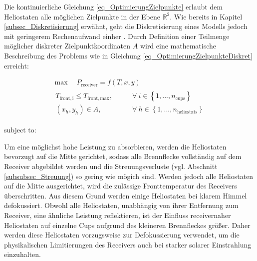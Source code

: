 Die kontinuierliche Gleichung \ref{eq_OptimierungZielpunkte} erlaubt dem Heliostaten alle möglichen Zielpunkte in der Ebene $\mathbb{R}^2$.
Wie bereits in Kapitel \ref{subsec_Diskretisierung} erwähnt, geht die Diskretisierung eines Modells jedoch mit geringerem Rechenaufwand einher \cite[S.85]{DissBelhomme}.
Durch Definition einer Teilmenge möglicher diskreter Zielpunktkoordinaten $A$ wird eine mathematische Beschreibung des Problems wie in Gleichung \ref{eq_OptimierungZielpunkteDiskret} erreicht:

\begin{equation} \label{eq_OptimierungZielpunkteDiskret}
    \begin{gathered}
\max \quad P_{\mathrm{receiver}}=f(T,x,y)  \qquad \\
        \begin{aligned}
T_{\mathrm{front,i}} \leq T_{\mathrm{front,max}}, \qquad      & \forall~i \in \left\{1, ..., n_{\mathrm{cups}} \right\}       \\
\left(x_{h}, y_{h}\right) \in A, \qquad & \forall~h \in \left\{1, ..., n_{\mathrm{heliostats}} \right\}
        \end{aligned}
    \end{gathered}
\end{equation}

\vspace*{-2.95\baselineskip}
\qquad subject to:
\vspace*{1.95\baselineskip}

Um eine möglichst hohe Leistung zu absorbieren, werden die Heliostaten bevorzugt auf die Mitte gerichtet, sodass alle Brennflecke vollständig auf dem Receiver abgebildet werden und die Streuungsverluste (vgl. Abschnitt \ref{subsubsec_Streuung}) so gering wie mögich sind.
Werden jedoch alle Heliostaten auf die Mitte ausgerichtet, wird die zulässige Fronttemperatur des Receivers überschritten.
Aus diesem Grund werden einige Heliostaten bei klarem Himmel defokussiert.
Obwohl alle Heliostaten, unabhängig von ihrer Entfernung zum Receiver, eine ähnliche Leistung reflektieren, ist der Einfluss receivernaher Heliostaten auf einzelne Cups aufgrund des kleineren Brennfleckes größer.
Daher werden diese Heliostaten vorzugsweise zur Defokussierung verwendet, um die physikalischen Limitierungen des Receivers auch bei starker solarer Einstrahlung einzuhalten.

